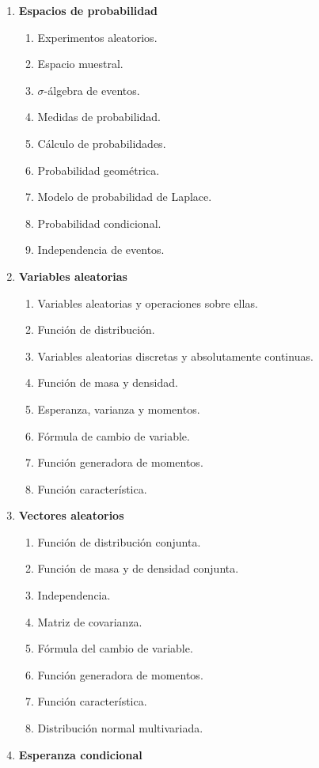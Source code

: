 \begin{refsection}
\begin{enumerate}
\item \textbf{Espacios de probabilidad}
\begin{enumerate}
\item Experimentos aleatorios.
\item Espacio muestral.
\item $\sigma$-álgebra de eventos.
\item Medidas de probabilidad.
\item Cálculo de probabilidades.
\item Probabilidad geométrica.
\item Modelo de probabilidad de Laplace.
\item Probabilidad condicional.
\item Independencia de eventos.
\end{enumerate}
\item \textbf{Variables aleatorias}
\begin{enumerate}
\item Variables aleatorias y operaciones sobre ellas.
\item Función de distribución.
\item Variables aleatorias discretas y absolutamente continuas.
\item Función de masa y densidad.
\item Esperanza, varianza y momentos.
\item Fórmula de cambio de variable.
\item Función generadora de momentos.
\item Función característica.
\end{enumerate}
\item \textbf{Vectores aleatorios}
\begin{enumerate}
\item Función de distribución conjunta.
\item Función de masa y de densidad conjunta.
\item Independencia.
\item Matriz de covarianza.
\item Fórmula del cambio de variable.
\item Función generadora de momentos.
\item Función característica.
\item Distribución normal multivariada.
\end{enumerate}
\item \textbf{Esperanza condicional}

\end{enumerate}
\end{refsection}
